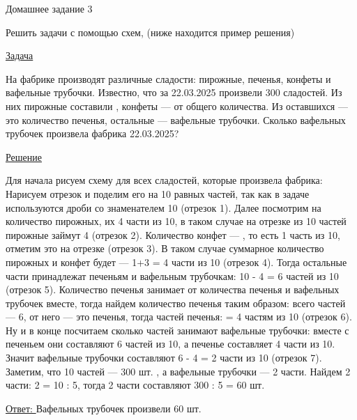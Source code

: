 \documentclass{article}
\begin{document}
{\fontsize{20}{18} \selectfont Домашнее задание 3}
\vspace{0.4cm}




{\fontsize{13}{8} \selectfont  Решить задачи с помощью схем, \color{gray} (ниже находится пример решения) }

\vspace{1.2cm}

{\fontsize{14}{10} \selectfont  \underline{Задача}}

\vspace{0.3cm}

{\fontsize{10}{8} \selectfont На фабрике производят различные сладости: пирожные, печенья, конфеты и вафельные трубочки. 
Известно, что за 22.03.2025 произвели 300 сладостей. Из них пирожные составили , конфеты ---  
от общего количества. Из оставшихся ---  это количество печенья, остальные --- вафельные трубочки. 
Сколько вафельных трубочек произвела фабрика 22.03.2025?}

\vspace{1cm}

{\fontsize{14}{10} \selectfont  \underline{Решение}}

\vspace{0.3cm}
{\fontsize{10}{8} \selectfont Для начала рисуем схему для всех сладостей, которые произвела фабрика: 
Нарисуем отрезок и поделим его на 10 равных частей, так как в задаче используются дроби со знаменателем 10 {\color{gray} (отрезок 1)}.
Далее посмотрим на количество пирожных, их 4 части из 10, в таком случае на отрезке из 10 частей пирожные займут 4 {\color{gray} (отрезок 2)}.
Количество конфет --- , то есть 1 часть из 10, отметим это на отрезке {\color{gray} (отрезок 3)}. 
В таком случае суммарное количество пирожных и конфет будет --- 1+3 = 4 части из 10 {\color{gray} (отрезок 4)}.
Тогда остальные части принадлежат печеньям и вафельным трубочкам: 10 - 4 = 6 частей из 10 {\color{gray} (отрезок 5)}.
Количество печенья занимает  от количества печенья и вафельных трубочек вместе, тогда найдем количество печенья таким образом:
всего частей --- 6,  от него --- это печенья, тогда частей печенья: 
 = 4 частям из 10 {\color{gray} (отрезок 6)}. 
Ну и в конце посчитаем сколько частей занимают вафельные трубочки: вместе с печеньем они составляют 6 частей из 10, а печенье составляет 4 части из 10. 
Значит вафельные трубочки составляют 6 - 4 = 2 части из 10 {\color{gray} (отрезок 7)}. Заметим, что 10 частей --- 300 шт. , 
а вафельные трубочки --- 2 части. Найдем 2 части: 2 = 10 : 5, тогда 2 части составляют 300 : 5 = 60 шт. 

\vspace{0.3cm}
{\fontsize{12}{9} \selectfont \underline{Ответ: }} Вафельных трубочек произвели 60 шт. 
} 
\end{document}
